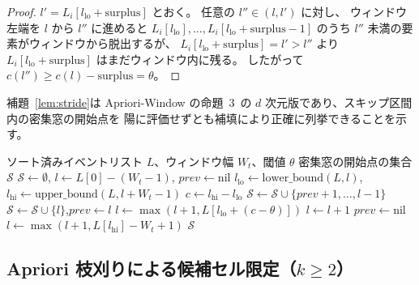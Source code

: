 \begin{proof}
$l' = L_i[l_{\mathrm{lo}} + \mathrm{surplus}]$ とおく。
任意の $l'' \in (l, l')$ に対し、
ウィンドウ左端を $l$ から $l''$ に進めると
$L_i[l_{\mathrm{lo}}], \ldots, L_i[l_{\mathrm{lo}} + \mathrm{surplus} - 1]$
のうち $l''$ 未満の要素がウィンドウから脱出するが、
$L_i[l_{\mathrm{lo}} + \mathrm{surplus}] = l' > l''$ より
$L_i[l_{\mathrm{lo}} + \mathrm{surplus}]$ はまだウィンドウ内に残る。
したがって $c(l'') \geq c(l) - \mathrm{surplus} = \theta$。
\end{proof}

補題~\ref{lem:stride}は Apriori-Window の命題~3~\cite{aprioriwindow}の
$d$ 次元版であり、スキップ区間内の密集窓の開始点を
陽に評価せずとも補填により正確に列挙できることを示す。

\begin{algorithm}[t]
\caption{$t$ 軸 1 次元ストライドによる密集窓の開始点列挙}
\label{alg:t_stride}
\begin{algorithmic}[1]
\Require ソート済みイベントリスト $L$、ウィンドウ幅 $W_t$、閾値 $\theta$
\Ensure 密集窓の開始点の集合 $\mathcal{S}$
\State $\mathcal{S} \leftarrow \emptyset$,\quad
       $l \leftarrow L[0] - (W_t - 1)$,\quad
       $\mathit{prev} \leftarrow \mathrm{nil}$
  \State $l_{\mathrm{lo}} \leftarrow \mathrm{lower\_bound}(L, l)$,\quad
         $l_{\mathrm{hi}} \leftarrow \mathrm{upper\_bound}(L, l + W_t - 1)$
  \State $c \leftarrow l_{\mathrm{hi}} - l_{\mathrm{lo}}$
      \State $\mathcal{S} \leftarrow \mathcal{S} \cup \{\mathit{prev}+1, \ldots, l-1\}$
    \EndIf
    \State $\mathcal{S} \leftarrow \mathcal{S} \cup \{l\}$,\quad $\mathit{prev} \leftarrow l$
      \State $l \leftarrow \max(l+1, L[l_{\mathrm{lo}} + (c - \theta)])$
    \Else
      \State $l \leftarrow l + 1$
    \EndIf
  \Else
    \State $\mathit{prev} \leftarrow \mathrm{nil}$
    \State $l \leftarrow \max(l+1, L[l_{\mathrm{hi}}] - W_t + 1)$
  \EndIf
\EndWhile
\Return $\mathcal{S}$
\end{algorithmic}
\end{algorithm}

\subsection{Apriori 枝刈りによる候補セル限定（$k \geq 2$）}\label{sec:alg_k2}

